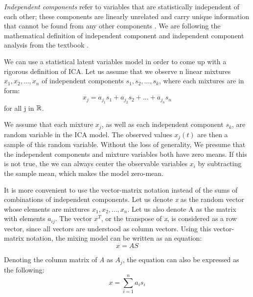 \begin{definition} \emph{Independent components} refer to variables that are statistically independent of each other; these components are linearly unrelated and carry unique information that cannot be found from any other components \cite{Tharwat}. We are following the mathematical definition of independent component and independent component analysis from the textbook \cite{Aapo}. 

We can use a statistical latent variables model in order to come up with a rigorous definition of ICA. Let us assume that we observe n linear mixtures $x_{1},x_{2}, ... , x_{n}$ of independent components $s_{1},s_{2}, ... , s_{k}$, where each mixtures are in form:
\begin{equation}
x_{j} = a_{j_{1}}s_{1} + a_{j_{2}}s_{2} + ... + a_{j_{n}}s_{n}
\end{equation}
for all j in $\mathbb{R}$.

We assume that each mixture $x_{j}$, as well as each independent component $s_{k}$, are random variable in the ICA model. The observed values $x_{j}(t)$ are then a sample of this random variable. Without the loss of generality, We presume that the independent components and mixture variables both have zero means. If this is not true, the we can always center the observable variables $x_{i}$ by subtracting the sample mean, which makes the model zero-mean.

It is more convenient to use the vector-matrix notation instead of the sums of combinations of independent components. Let us denote \emph{x} as the random vector whose elements are mixtures $x_{1},x_{2}, ... , x_{n}$. Let us also denote A as the matrix with elements $a_{ij}$. The vector $x^{T}$, or the transpose of \emph{x}, is considered as a row vector, since all vectors are understood as column vectors. Using this vector-matrix notation, the mixing model can be written as an equation:
\begin{equation}
x = AS
\end{equation}

Denoting the column matrix of \emph{A} as $A_{j}$, the equation can also be expressed as the following:
\begin{equation}
x = \sum_{i = 1}^{n}a_{i}s_{i}
\end{equation}


\end{definition}
